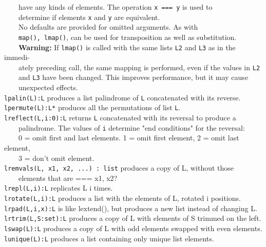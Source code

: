  \ \ \ \  have any kinds of elements. The operation \texttt{x === y} is used to\\
 \ \ \ \  determine if elements \texttt{x} and \texttt{y} are equivalent.\\
 \ \ \ \  No defaults are provided for omitted arguments. As with\\
 \ \ \ \ \texttt{map(), lmap()}, can be used for transposition as well as substitution.\\
 \ \ \ \ \textbf{Warning: }If \texttt{lmap()} is called with
 the same lists \texttt{L2} and \texttt{L3} as in the
immedi-\\
 \ \ \ \ ately preceding call, the same mapping is performed, even if
 the values in \texttt{L2} \\
 \ \ \ \ and \texttt{L3} have been changed. This improves performance,
 but it may cause \\
 \ \ \ \ unexpected effects. \\
\texttt{lpalin(L):L} produces a list palindrome of \texttt{L}
concatenated with its reverse.\\
\texttt{lpermute(L):L*} produces all the permutations of list
\texttt{L}.\\
\texttt{lreflect(L,i:0):L} returns \texttt{L} concatenated with its
reversal to produce a\\
 \ \ \ \ palindrome. The values of \texttt{i} determine
"end conditions" for the reversal:\\
 \ \ \ \ 0 = omit first and last elements. 1 = omit first element, 2 =
omit last element,\\
 \ \ \ \ 3 = don't omit element.\\
\texttt{lremvals(L, x1, x2, ...) : list} produces a copy of L, without
those\\
 \ \ \ \ elements that are === x1, x2?\\
\texttt{lrepl(L,i):L} replicates L i
times.\\
\texttt{lrotate(L,i):L} produces a list with the elements of L, rotated i
positions.\\
\texttt{lrpad(L,i,x):L} is like lextend(), but produces a new list instead of
changing L.\\
\texttt{lrtrim(L,S:set):L} produces a copy of L with elements of S trimmed on
 the left.\\
\texttt{lswap(L):L} produces a copy of L with odd elements swapped with even
elements.\\
\texttt{lunique(L):L} produces a list containing only unique list elements.

